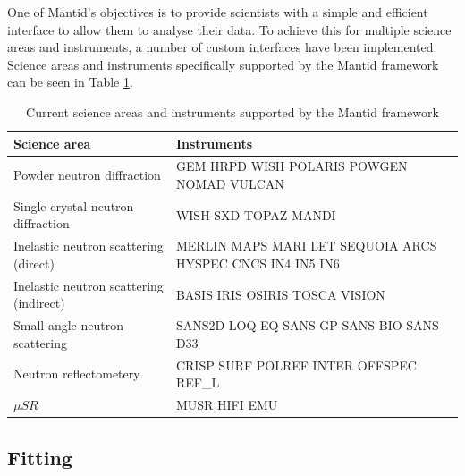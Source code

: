 \documentclass[1p]{elsarticle}
\begin{document}
One of Mantid's objectives is to provide scientists with a simple and efficient interface to allow them to analyse their data.  To achieve this for multiple science areas and instruments, a number of custom interfaces have been implemented. 
Science areas and instruments specifically supported by the Mantid framework can be seen in Table \ref{table:Coverage}.



\begin{table}[!htdp]

\footnotesize
\begin{tabular}{p{} |  p{} }
Science area &Instruments \\ \hline
Powder neutron diffraction&GEM HRPD WISH POLARIS POWGEN NOMAD VULCAN\\
Single crystal neutron diffraction&WISH SXD TOPAZ MANDI\\
Inelastic neutron scattering (direct)&MERLIN MAPS MARI LET SEQUOIA ARCS HYSPEC CNCS IN4 IN5 IN6 \\
Inelastic neutron scattering (indirect)&BASIS IRIS OSIRIS TOSCA VISION\\
Small angle neutron scattering &SANS2D LOQ EQ-SANS GP-SANS BIO-SANS D33\\
Neutron reflectometery&CRISP SURF POLREF INTER OFFSPEC REF\_L\\
$\mu SR$&MUSR HIFI EMU\\
\end{tabular}
\caption{Current science areas and instruments supported by the Mantid framework}
\label{table:Coverage}
\end{table}




\subsection {Fitting}
\end{document}
